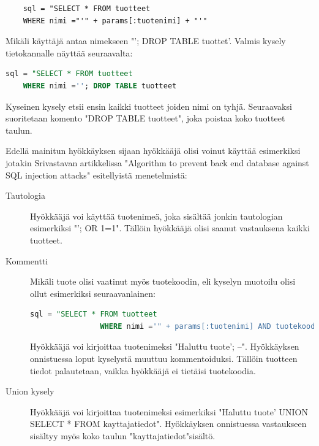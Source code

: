 \documentclass[finnish]{tktltiki2}
\theoremstyle{definition}
\theoremstyle{remark}
\begin{document}
	\begin{lstlisting}
	sql = "SELECT * FROM tuotteet
	WHERE nimi ="'" + params[:tuotenimi] + "'"
	\end{lstlisting}
	
	Mikäli käyttäjä antaa nimekseen "\space'; DROP TABLE tuottet'. Valmis kysely tietokannalle näyttää seuraavalta:
	
	\begin{lstlisting}[language=sql]
	sql = "SELECT * FROM tuotteet
	WHERE nimi =''; DROP TABLE tuotteet     
	\end{lstlisting}
	
	Kyseinen kysely etsii ensin kaikki tuotteet joiden nimi on tyhjä. Seuraavaksi suoritetaan komento "DROP TABLE tuotteet", joka poistaa koko tuotteet taulun.
	
	 Edellä mainitun hyökkäyksen sijaan hyökkääjä olisi voinut käyttää esimerkiksi jotakin Srivastavan artikkelissa "Algorithm to prevent back end database against SQL injection attacks"\space \cite{piggy} esitellyistä menetelmistä:  
		\begin{description}
			
		\item[Tautologia] \hfill
		
		Hyökkääjä voi käyttää tuotenimeä, joka sisältää jonkin tautologian esimerkiksi "'; OR 1=1". Tällöin hyökkääjä olisi saanut vastauksena kaikki tuotteet.
		
		\item[Kommentti] \hfill
		
		Mikäli tuote olisi vaatinut myös tuotekoodin, eli kyselyn muotoilu olisi ollut esimerkiksi seuraavanlainen:
			\begin{lstlisting}[language=sql]
				sql = "SELECT * FROM tuotteet
				WHERE nimi ='" + params[:tuotenimi] AND tuotekoodi ='"params[:tuotekoodi]"'
			\end{lstlisting}
			Hyökkääjä voi kirjoittaa tuotenimeksi "Haluttu tuote'; --". Hyökkäyksen onnistuessa loput kyselystä muuttuu kommentoiduksi. Tällöin tuotteen tiedot palautetaan, vaikka hyökkääjä ei tietäisi tuotekoodia.
			
		\item[Union kysely] \hfill
		
		Hyökkääjä voi kirjoittaa tuotenimeksi esimerkiksi "Haluttu tuote' UNION SELECT * FROM kayttajatiedot". Hyökkäyksen onnistuessa vastaukseen sisältyy myös koko taulun "kayttajatiedot"\space sisältö.
	\end{description}
	
\end{document}
